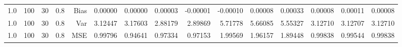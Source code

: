 \begin{table}[!htbp]
\begin{tabular}{lrrrrrrrrrrrrrr}
1.0 & 100 & 30 & 0.8 & Bias & 0.00000 & 0.00000 & 0.00003 & -0.00001 & -0.00010 & 0.00008 & 0.00033 & 0.00008 & 0.00011 & 0.00008 \\
1.0 & 100 & 30 & 0.8 & Var & 3.12447 & 3.17603 & 2.88179 & 2.89869 & 5.71778 & 5.66085 & 5.55327 & 3.12710 & 3.12707 & 3.12710 \\
1.0 & 100 & 30 & 0.8 & MSE & 0.99796 & 0.94641 & 0.97334 & 0.97153 & 1.99569 & 1.96157 & 1.89448 & 0.99838 & 0.99544 & 0.99838 \\
\hline
\end{tabular}
\end{table}


